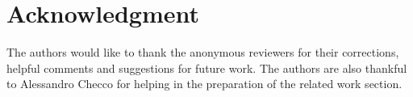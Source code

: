 \documentclass[conference]{IEEEtran}
\newcommand{\Az}[1]{{\color{black}{#1}}}
\begin{document}


%




\section*{Acknowledgment}

The authors would like to thank the anonymous reviewers for their corrections, helpful comments and suggestions for future work. The authors are also thankful to Alessandro Checco for helping in the preparation of the related work section.





\end{document}
